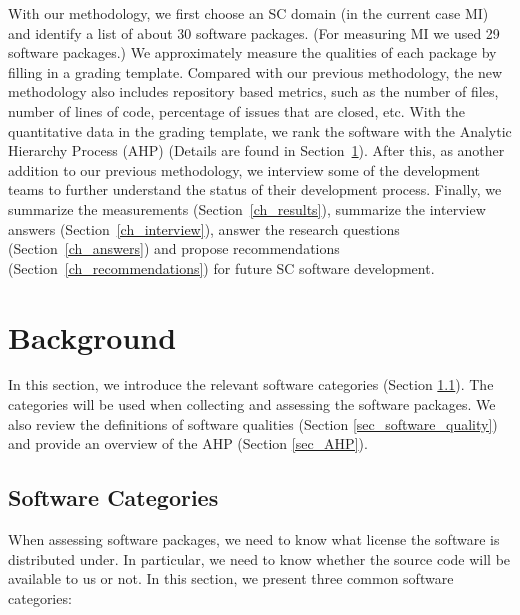 \documentclass[3p, 12pt,authoryear]{elsarticle}
\begin{document}
With our methodology, we first choose an SC domain (in the current case MI) and
identify a list of about 30 software packages. (For measuring MI we used 29
software packages.)  We approximately measure the qualities of each package by
filling in a grading template. Compared with our previous methodology, the new
methodology also includes repository based metrics, such as the number of files,
number of lines of code, percentage of issues that are closed, etc.  With the
quantitative data in the grading template, we rank the software with the
Analytic Hierarchy Process (AHP) (Details are found in
Section~\ref{ch_background}). After this, as another addition to our previous
methodology, we interview some of the development teams to further understand
the status of their development process. Finally, we summarize the measurements
(Section~\ref{ch_results}), summarize the interview answers
(Section~\ref{ch_interview}), answer the research questions
(Section~\ref{ch_answers}) and propose recommendations
(Section~\ref{ch_recommendations}) for future SC software development.

\section{Background} \label{ch_background}

In this section, we introduce the relevant software categories (Section
\ref{sec_software_categories}). The categories will be used when collecting and
assessing the software packages.  We also review the definitions of software
qualities (Section \ref{sec_software_quality}) and provide an overview of the
AHP (Section \ref{sec_AHP}).

\subsection{Software Categories} \label{sec_software_categories}

When assessing software packages, we need to know what license the software is
distributed under.  In particular, we need to know whether the source code will
be available to us or not.  In this section, we present three common software
categories:
\end{document}
